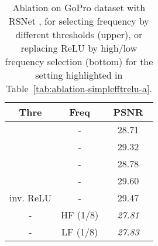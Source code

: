 \documentclass[letterpaper]{article} \usepackage{aaai23}  \usepackage{times}  \usepackage{helvet}  \usepackage{courier}  \usepackage[hyphens]{url}  \usepackage{graphicx} \usepackage{enumitem}
\begin{document}
\begin{table}[t]
\renewcommand\arraystretch{1}
\footnotesize
\centering
\caption{Ablation on GoPro dataset with RSNet \cite{Nah2017deep} for Fig.~\ref{fig:simple-fft-relu}(a) (upper area) and Fig.~\ref{fig:simple-fft-relu}(b) (bottom area). ``'' for  means the left stream is totally removed in Fig.~\ref{fig:simple-fft-relu}(a). Result worse than RSNet is in \textit{italics}.}
\label{tab:ablation-simplefftrelu-a}
\end{table}

\begin{table}[t]
\renewcommand\arraystretch{1}
\footnotesize
\centering
\caption{Ablation on GoPro dataset with RSNet \cite{Nah2017deep}, for selecting frequency by different thresholds (upper), or replacing ReLU by high/low frequency selection (bottom) for the setting \colorbox{gray!20}{highlighted} in Table~\ref{tab:ablation-simplefftrelu-a}.}
\label{tab:ablation-simplefftrelu-b}
\begin{tabular}{c|c|c}
\toprule[0.15em]
\textbf{Thre} & \textbf{Freq} & ~\textbf{PSNR}~\\
\midrule
 & - &  28.71\\
 & - & 29.32  \\
 & - & 28.78\\
 & - & 29.60\\
inv. ReLU & - & 29.47\\
\midrule
- & HF (1/8) & \textit{27.81}\\
- & LF (1/8) & \textit{27.83}\\
\bottomrule[0.15em]
\end{tabular}
\end{table}
\end{document}
